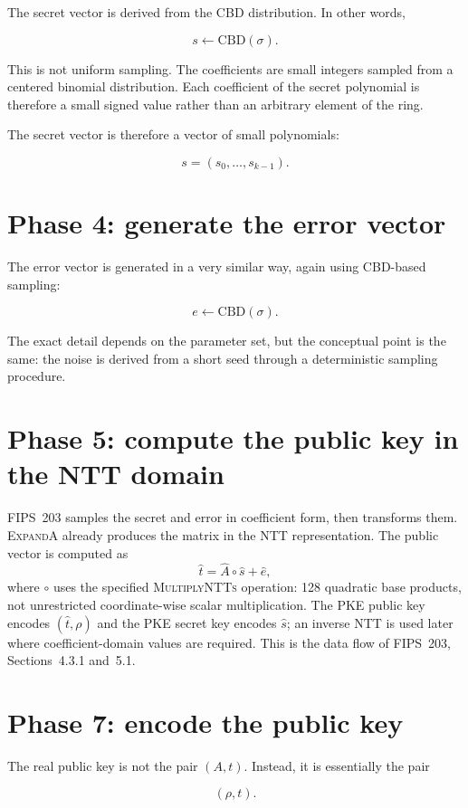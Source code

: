 The secret vector is derived from the CBD distribution. In other words,

\[
s \leftarrow \mathrm{CBD}(\sigma).
\]

This is not uniform sampling. The coefficients are small integers sampled from a centered binomial distribution. Each coefficient of the secret polynomial is therefore a small signed value rather than an arbitrary element of the ring.

The secret vector is therefore a vector of small polynomials:

\[
s = (s_0, \dots, s_{k-1}).
\]

\section{Phase 4: generate the error vector}

The error vector is generated in a very similar way, again using CBD-based sampling:

\[
e \leftarrow \mathrm{CBD}(\sigma).
\]

The exact detail depends on the parameter set, but the conceptual point is the same: the noise is derived from a short seed through a deterministic sampling procedure.

\section{Phase 5: compute the public key in the NTT domain}

FIPS~203 samples the secret and error in coefficient form, then transforms them. \textsc{ExpandA} already produces the matrix in the NTT representation. The public vector is computed as
\[
\hat t=\hat A\circ\hat s+\hat e,
\]
where $\circ$ uses the specified \textsc{MultiplyNTTs} operation: 128 quadratic base products, not unrestricted coordinate-wise scalar multiplication. The PKE public key encodes $(\hat t,\rho)$ and the PKE secret key encodes $\hat s$; an inverse NTT is used later where coefficient-domain values are required. This is the data flow of FIPS~203, Sections~4.3.1 and~5.1.

\section{Phase 7: encode the public key}

The real public key is not the pair \((A,t)\). Instead, it is essentially the pair

\[
(\rho, t).
\]

